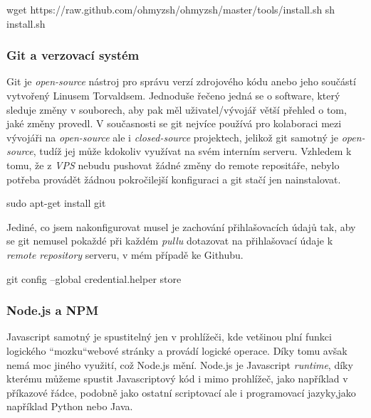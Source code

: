 \documentclass[12pt,a4paper]{report}
\begin{document}
  \begin{bash}
    wget https://raw.github.com/ohmyzsh/ohmyzsh/master/tools/install.sh
    sh install.sh
  \end{bash}

  \subsubsection{Git a verzovací systém}
  Git je \emph{open-source} nástroj pro správu verzí zdrojového kódu anebo jeho součástí vytvořený Linusem Torvaldsem. 
  Jednoduše řečeno jedná se o software, který sleduje změny v souborech, aby pak měl uživatel/vývojář 
  větší přehled o tom, jaké změny provedl. V současnosti se git nejvíce používá pro kolaboraci mezi vývojáři na \emph{open-source}
   ale i \emph{closed-source} projektech, jelikož git samotný je \emph{open-source}, tudíž jej může kdokoliv využívat na svém interním serveru.
  Vzhledem k tomu, že z \emph{VPS} nebudu pushovat žádné změny do remote repositáře, nebylo potřeba provádět žádnou pokročilejší konfiguraci 
  a git stačí jen nainstalovat.
  \begin{bash}
    sudo apt-get install git
  \end{bash}
  Jediné, co jsem nakonfigurovat musel je zachování přihlašovacích údajů tak, aby se git nemusel pokaždé při každém \emph{pullu} dotazovat
   na přihlašovací údaje k \emph{remote repository} serveru, v mém případě ke Githubu.
  \begin{bash}
    git config --global credential.helper store
  \end{bash}
  \subsubsection{Node.js a NPM}
  Javascript samotný je spustitelný jen v prohlížeči, kde vetšinou plní funkci logického ``mozku``\space webové stránky a provádí logické operace. 
  Díky tomu avšak nemá moc jiného využití, což Node.js mění.
  Node.js je Javascript \emph{runtime}, díky kterému můžeme spustit Javascriptový 
  kód i mimo prohlížeč, jako například v příkazové řádce, podobně jako ostatní scriptovací ale i programovací jazyky,jako například Python nebo Java.
 
\end{document}
